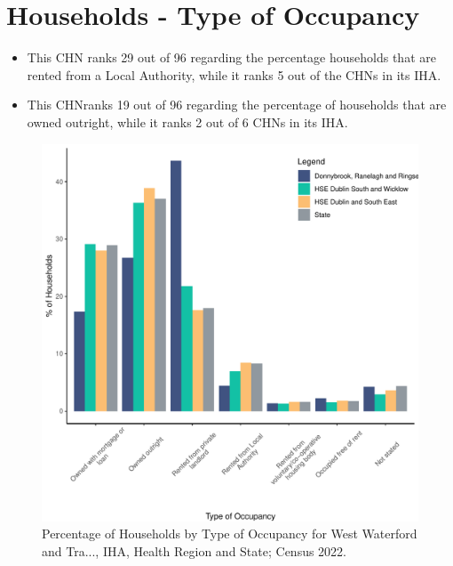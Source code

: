 \documentclass{article}
\begin{document}
\section{Households - Type of Occupancy}\label{sect:Households}
\begin{itemize}
\item This CHN ranks  29 out of 96 regarding the percentage households that are rented from a Local Authority, while it ranks  5 out of the CHNs in its IHA. 
\item This CHNranks  19 out of 96 regarding the percentage of households that are owned outright, while it ranks   2 out of 6 CHNs in its IHA.
\end{itemize}
\begin{figure}[H]
	\centering
	\includegraphics[width = 140mm]{../figures/HouseholdsED.pdf}
	\caption{Percentage of Households by Type of Occupancy for West Waterford and Tra..., IHA, Health Region and State; Census 2022.}
	\label{fig:vbnv}
	\end{figure}
\end{document}
